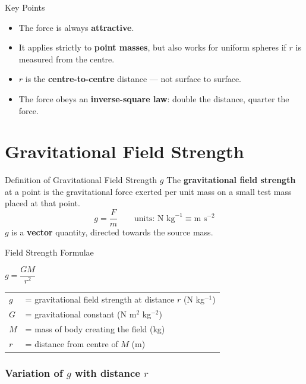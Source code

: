 \documentclass[12pt,a4paper]{article}
\begin{document}
\begin{keybox}{Key Points}
\begin{itemize}[itemsep=2pt]
  \item The force is always \textbf{attractive}.
  \item It applies strictly to \textbf{point masses}, but also works for uniform spheres if $r$ is measured from the centre.
  \item $r$ is the \textbf{centre-to-centre} distance — not surface to surface.
  \item The force obeys an \textbf{inverse-square law}: double the distance, quarter the force.
\end{itemize}
\end{keybox}

\section{Gravitational Field Strength}

\begin{definitionbox}{Definition of Gravitational Field Strength $g$}
The \textbf{gravitational field strength} at a point is the gravitational force exerted per unit mass on a small test mass placed at that point.
$$g = \frac{F}{m} \qquad \text{units: N kg}^{-1} \equiv \text{m s}^{-2}$$
$g$ is a \textbf{vector} quantity, directed towards the source mass.
\end{definitionbox}

\begin{formulabox}{Field Strength Formulae}
\begin{center}
\Large $g = \dfrac{GM}{r^2}$
\end{center}
\vspace{0.3em}
\begin{tabular}{@{}ll@{}}
$g$ & = gravitational field strength at distance $r$ (N kg$^{-1}$) \\
$G$ & = gravitational constant (N m$^2$ kg$^{-2}$) \\
$M$ & = mass of body creating the field (kg) \\
$r$ & = distance from centre of $M$ (m) \\
\end{tabular}
\end{formulabox}

\subsubsection*{Variation of $g$ with distance $r$}
\end{document}

